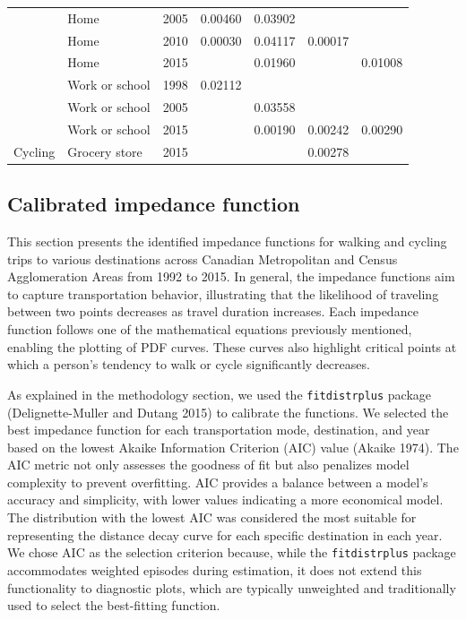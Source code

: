 \documentclass[preprint, 3p,
authoryear]{elsarticle} %
\begin{document}
\begin{table}
{\begin{tabular}[t]{lllrrrr}
 & Home & 2005 & 0.00460 & 0.03902 &  & \\

 & Home & 2010 & 0.00030 & 0.04117 & 0.00017 & \\

 & Home & 2015 &  & 0.01960 &  & 0.01008\\

 & Work or school & 1998 & 0.02112 &  &  & \\

 & Work or school & 2005 &  & 0.03558 &  & \\

 & Work or school & 2015 &  & 0.00190 & 0.00242 & 0.00290\\

\multirow[t]{-9}{*}{\raggedright\arraybackslash Cycling} & Grocery store & 2015 &  &  & 0.00278 & \\
\bottomrule
\end{tabular}}
\end{table}

\hypertarget{calibrated-impedance-function}{%
\subsection{Calibrated impedance
function}\label{calibrated-impedance-function}}

This section presents the identified impedance functions for walking and
cycling trips to various destinations across Canadian Metropolitan and
Census Agglomeration Areas from 1992 to 2015. In general, the impedance
functions aim to capture transportation behavior, illustrating that the
likelihood of traveling between two points decreases as travel duration
increases. Each impedance function follows one of the mathematical
equations previously mentioned, enabling the plotting of PDF curves.
These curves also highlight critical points at which a person's tendency
to walk or cycle significantly decreases.

As explained in the methodology section, we used the
\texttt{fitdistrplus} package (Delignette-Muller and Dutang 2015) to
calibrate the functions. We selected the best impedance function for
each transportation mode, destination, and year based on the lowest
Akaike Information Criterion (AIC) value (Akaike 1974). The AIC metric
not only assesses the goodness of fit but also penalizes model
complexity to prevent overfitting. AIC provides a balance between a
model's accuracy and simplicity, with lower values indicating a more
economical model. The distribution with the lowest AIC was considered
the most suitable for representing the distance decay curve for each
specific destination in each year. We chose AIC as the selection
criterion because, while the \texttt{fitdistrplus} package accommodates
weighted episodes during estimation, it does not extend this
functionality to diagnostic plots, which are typically unweighted and
traditionally used to select the best-fitting function.
\end{document}

